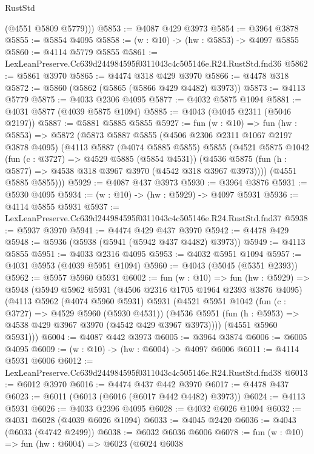 \begin{lexlean}{RustStd}
\begin{coremodule}
        (@4551 @5809 @5779)))
@5853 := @4087 @429 @3973
@5854 := @3964 @3878
@5855 := @5854 @4095
@5858 := (w : @10) -> (hw : @5853) -> @4097 @5855
@5860 := @4114 @5779 @5855
@5861 := LexLeanPreserve.Cc639d244984595f0311043c4c505146e.R24.RustStd.fnd36
@5862 := @5861 @3970
@5865 := @4474 @318 @429 @3970
@5866 := @4478 @318
@5872 := @5860 (@5862 (@5865 (@5866 @429 @4482) @3973))
@5873 := @4113 @5779
@5875 := @4033 @2306 @4095
@5877 := @4032 @5875 @1094
@5881 := @4031 @5877 (@4039 @5875 @1094)
@5885 := @4043 (@4045 @2311 (@5046 @2197))
@5887 := @5881 @5885 @5855
@5927 := fun (w : @10) =>
  fun (hw : @5853) =>
  @5872
    (@5873
      @5887
      @5855
      (@4506 @2306 @2311 @1067 @2197 @3878 @4095)
      (@4113
        @5887
        (@4074 @5885 @5855)
        @5855
        (@4521
          @5875
          @1042
          (fun (c : @3727) => @4529 @5885 (@5854 @4531))
          (@4536 @5875 (fun (h : @5877) => @4538 @318 @3967 @3970 (@4542 @318 @3967 @3973))))
        (@4551 @5885 @5855)))
@5929 := @4087 @437 @3973
@5930 := @3964 @3876
@5931 := @5930 @4095
@5934 := (w : @10) -> (hw : @5929) -> @4097 @5931
@5936 := @4114 @5855 @5931
@5937 := LexLeanPreserve.Cc639d244984595f0311043c4c505146e.R24.RustStd.fnd37
@5938 := @5937 @3970
@5941 := @4474 @429 @437 @3970
@5942 := @4478 @429
@5948 := @5936 (@5938 (@5941 (@5942 @437 @4482) @3973))
@5949 := @4113 @5855
@5951 := @4033 @2316 @4095
@5953 := @4032 @5951 @1094
@5957 := @4031 @5953 (@4039 @5951 @1094)
@5960 := @4043 (@5045 (@5351 @2393))
@5962 := @5957 @5960 @5931
@6002 := fun (w : @10) =>
  fun (hw : @5929) =>
  @5948
    (@5949
      @5962
      @5931
      (@4506 @2316 @1705 @1964 @2393 @3876 @4095)
      (@4113
        @5962
        (@4074 @5960 @5931)
        @5931
        (@4521
          @5951
          @1042
          (fun (c : @3727) => @4529 @5960 (@5930 @4531))
          (@4536 @5951 (fun (h : @5953) => @4538 @429 @3967 @3970 (@4542 @429 @3967 @3973))))
        (@4551 @5960 @5931)))
@6004 := @4087 @442 @3973
@6005 := @3964 @3874
@6006 := @6005 @4095
@6009 := (w : @10) -> (hw : @6004) -> @4097 @6006
@6011 := @4114 @5931 @6006
@6012 := LexLeanPreserve.Cc639d244984595f0311043c4c505146e.R24.RustStd.fnd38
@6013 := @6012 @3970
@6016 := @4474 @437 @442 @3970
@6017 := @4478 @437
@6023 := @6011 (@6013 (@6016 (@6017 @442 @4482) @3973))
@6024 := @4113 @5931
@6026 := @4033 @2396 @4095
@6028 := @4032 @6026 @1094
@6032 := @4031 @6028 (@4039 @6026 @1094)
@6033 := @4045 @2420
@6036 := @4043 (@6033 (@4742 @2499))
@6038 := @6032 @6036 @6006
@6078 := fun (w : @10) =>
  fun (hw : @6004) =>
  @6023
    (@6024
      @6038

\end{coremodule}
\end{lexlean}
